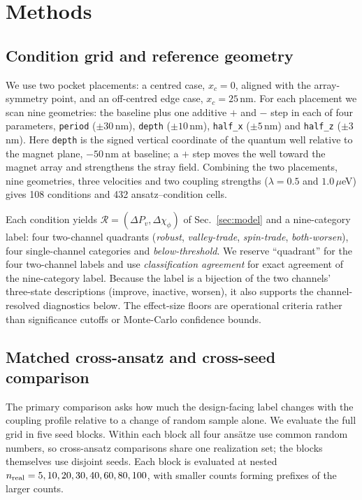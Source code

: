 \documentclass[aip,jap,reprint,superscriptaddress,longbibliography,floatfix]{revtex4-2}
\begin{document}
\section{Methods}
\label{sec:methods}
\subsection{Condition grid and reference geometry}

We use two pocket placements: a centred case, $x_c=0$, aligned with the
array-symmetry point, and an off-centred edge case, $x_c=25$\,nm. For each
placement we scan nine geometries: the baseline plus one additive $+$ and $-$
step in each of four parameters, \texttt{period} ($\pm30$\,nm),
\texttt{depth} ($\pm10$\,nm), \texttt{half\_x} ($\pm5$\,nm) and
\texttt{half\_z} ($\pm3$\,nm). Here \texttt{depth} is the signed vertical
coordinate of the quantum well relative to the magnet plane, $-50$\,nm at
baseline; a $+$ step moves the well toward the magnet array and strengthens the
stray field. Combining the two placements, nine geometries, three velocities
and two coupling strengths ($\lambda=0.5$ and $1.0\,\mu$eV) gives 108
conditions and 432 ansatz--condition cells.

Each condition yields $\mathcal{R}=(\Delta P_v,\Delta\chi_\phi)$ of
Sec.~\ref{sec:model} and a nine-category label: four two-channel quadrants (\emph{robust},
\emph{valley-trade}, \emph{spin-trade}, \emph{both-worsen}), four
single-channel categories and \emph{below-threshold}. We reserve
``quadrant'' for the four two-channel labels and use
\emph{classification agreement} for exact agreement of the nine-category
label. Because the label is a bijection of the two channels' three-state
descriptions (improve, inactive, worsen), it also supports the channel-resolved
diagnostics below. The effect-size floors are operational criteria rather than
significance cutoffs or Monte-Carlo confidence bounds.

\subsection{Matched cross-ansatz and cross-seed comparison}

The primary comparison asks how much the design-facing label changes with the
coupling profile relative to a change of random sample alone. We evaluate the
full grid in five seed blocks. Within each block all four ans\"atze use common
random numbers, so cross-ansatz comparisons share one realization set; the
blocks themselves use disjoint seeds. Each block is evaluated at nested
$n_{\rm real}=5,10,20,30,40,60,80,100$, with smaller counts forming prefixes of
the larger counts.
\end{document}
